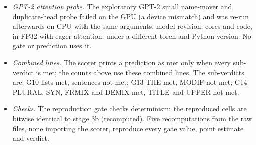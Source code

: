 \begin{itemize}
  \item \emph{GPT-2 attention probe.} The exploratory GPT-2 small name-mover and duplicate-head probe failed on the GPU (a device mismatch) and was re-run afterwards on CPU with the same arguments, model revision, cores and code, in FP32 with eager attention, under a different torch and Python version. No gate or prediction uses it.
  \item \emph{Combined lines.} The scorer prints a prediction as met only when every sub-verdict is met; the counts above use these combined lines. The sub-verdicts are: G10 lists met, sentences not met; G13 THE met, MODIF not met; G14 PLURAL, SYN, FRMIX and DEMIX met, TITLE and UPPER not met.
  \item \emph{Checks.} The reproduction gate checks determinism: the reproduced cells are bitwise identical to stage 3b (recomputed). Five recomputations from the raw files, none importing the scorer, reproduce every gate value, point estimate and verdict.
\end{itemize}

